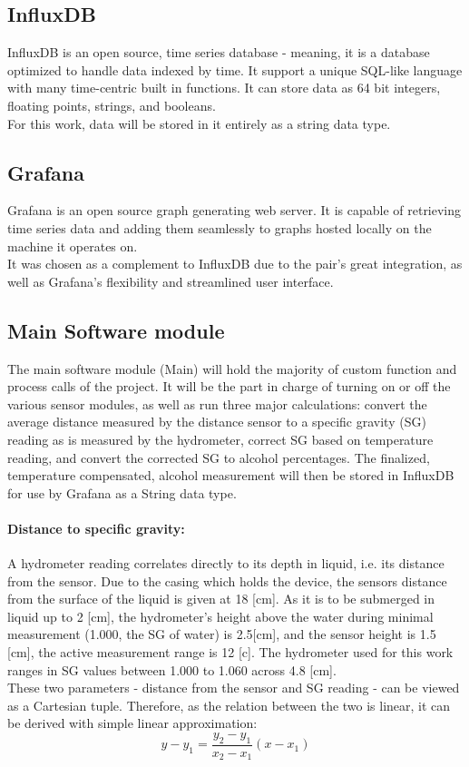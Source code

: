 \documentclass[twoside]{ctuthesis}
\theoremstyle{plain}
\theoremstyle{definition}
\theoremstyle{note}
\begin{document}
\subsection{InfluxDB}
InfluxDB is an open source, time series database - meaning, it is a database optimized to handle data indexed by time. It support a unique SQL-like language with many time-centric built in functions. It can store data as 64 bit integers, floating points, strings, and booleans.\\
For this work, data will be stored in it entirely as a string data type.

\subsection{Grafana}
Grafana is an open source graph generating web server. It is capable of retrieving time series data and adding them seamlessly to graphs hosted locally on the machine it operates on.\\
It was chosen as a complement to InfluxDB due to the pair's great integration, as well as Grafana's flexibility and streamlined user interface.

\subsection{Main Software module}
The main software module (Main) will hold the majority of custom function and process calls of the project. It will be the part in charge of turning on or off the various sensor modules, as well as run three major calculations: convert the average distance measured by the distance sensor to a specific gravity (SG) reading as is measured by the hydrometer, correct SG based on temperature reading, and convert the corrected SG to alcohol percentages. The finalized, temperature compensated, alcohol measurement will then be stored in InfluxDB for use by Grafana as a String data type.

\paragraph{Distance to specific gravity:}
A hydrometer reading correlates directly to its depth in liquid, i.e. its distance from the sensor. Due to the casing which holds the device, the sensors distance from the surface of the liquid is given at 18 [cm]. As it is to be submerged in liquid up to 2 [cm], the hydrometer's height above the water during minimal measurement (1.000, the SG of water) is 2.5[cm], and the sensor height is 1.5 [cm], the active measurement range is 12 [c]. The hydrometer used for this work ranges in SG values between 1.000 to 1.060 across 4.8 [cm].\\
These two parameters - distance from the sensor and SG reading - can be viewed as a Cartesian tuple. Therefore, as the relation between the two is linear, it can be derived with simple linear approximation:
\begin{equation}
y-y_1 = \frac{y_2 - y_1}{x_2 - x_1}(x - x_1)
\end{equation}
\end{document}
